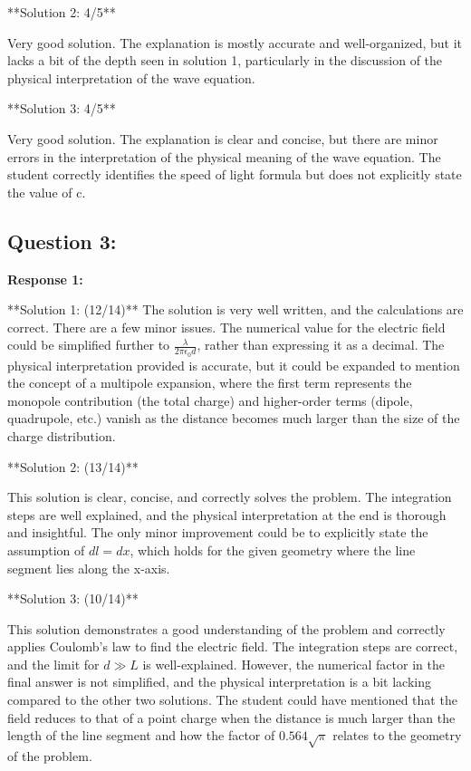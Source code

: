 \documentclass[a4paper,11pt]{article}
\begin{document}
**Solution 2: 4/5**

Very good solution. The explanation is mostly accurate and well-organized, but it lacks a bit of the depth seen in solution 1, particularly in the discussion of the physical interpretation of the wave equation.

**Solution 3: 4/5**

Very good solution. The explanation is clear and concise, but there are minor errors in the interpretation of the physical meaning of the wave equation. The student correctly identifies the speed of light formula but does not explicitly state the value of c.

\subsection*{Question 3:}

\textbf{Response 1:}

**Solution 1: (12/14)**
The solution is very well written, and the calculations are correct. There are a few minor issues. The numerical value for the electric field could be simplified further to \( \frac{\lambda}{2\pi\epsilon_0 d} \), rather than expressing it as a decimal. The physical interpretation provided is accurate, but it could be expanded to mention the concept of a multipole expansion, where the first term represents the monopole contribution (the total charge) and higher-order terms (dipole, quadrupole, etc.) vanish as the distance becomes much larger than the size of the charge distribution. 

**Solution 2: (13/14)**

This solution is clear, concise, and correctly solves the problem. The integration steps are well explained, and the physical interpretation at the end is thorough and insightful. The only minor improvement could be to explicitly state the assumption of \( dl = dx \), which holds for the given geometry where the line segment lies along the x-axis.

**Solution 3: (10/14)**

This solution demonstrates a good understanding of the problem and correctly applies Coulomb's law to find the electric field. The integration steps are correct, and the limit for \( d \gg L \) is well-explained. However, the numerical factor in the final answer is not simplified, and the physical interpretation is a bit lacking compared to the other two solutions. The student could have mentioned that the field reduces to that of a point charge when the distance is much larger than the length of the line segment and how the factor of \( 0.564 \sqrt{\pi} \) relates to the geometry of the problem.
\end{document}
